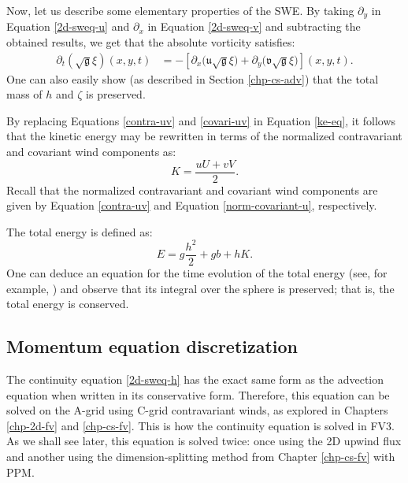 Now, let us describe some elementary properties of the SWE.
By taking $\partial_y$ in Equation \eqref{2d-sweq-u} and $\partial_x$ in Equation \eqref{2d-sweq-v} and
subtracting the obtained results, we get that the absolute vorticity satisfies:
\begin{align}
	\label{absvort-eq}
	{\partial_t (\sqrt{\mathfrak{g}} {\xi})}(x,y,t) & = 
	-[{\partial_x (\mathfrak{u}\sqrt{\mathfrak{g}}{\xi}})
	+ {\partial_y (\mathfrak{v}\sqrt{\mathfrak{g}}{\xi}})](x,y,t).
\end{align}
One can also easily show (as described in Section \ref{chp-cs-adv}) that the total mass of $h$ and $\zeta$ is preserved.

By replacing Equations \eqref{contra-uv} and \eqref{covari-uv} in Equation \eqref{ke-eq}, 
it follows that the kinetic energy may be rewritten in terms of the normalized contravariant and covariant wind components as:
\begin{equation}
	\label{ke-eq2}
	K = \frac{{u}{U}+{v}{V}}{2}.
\end{equation}
Recall that the normalized contravariant and covariant wind components
are given by Equation \eqref{contra-uv} and Equation \eqref{norm-covariant-u}, respectively.

The total energy is defined as:
\begin{equation}
	\label{energy}
	E = g\frac{h^2}{2} + gb + hK.
\end{equation}
One can deduce an equation for the time evolution of the total energy (see, for example, \citet{ringler:2010}) 
and observe that its integral over the sphere is preserved; that is, the total energy is conserved.

\subsection{Momentum equation discretization}
The continuity equation \eqref{2d-sweq-h} has the exact same form as the advection equation when written in its conservative form.
Therefore, this equation can be solved on the A-grid using C-grid contravariant winds, as explored in Chapters \ref{chp-2d-fv} and \ref{chp-cs-fv}.
This is how the continuity equation is solved in FV3.
As we shall see later, this equation is solved twice: 
once using the 2D upwind flux and another using the dimension-splitting method from Chapter \ref{chp-cs-fv} with PPM.

